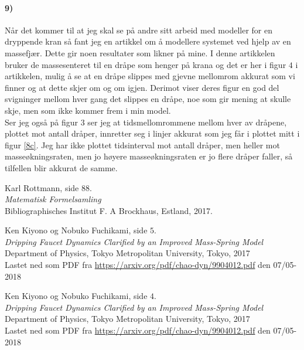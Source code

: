 \documentclass[11pt, A4paper,norsk]{article}
\begin{document}
		\paragraph{9)}
			\begin{flushleft}
Når det kommer til at jeg skal se på andre sitt arbeid med modeller for en dryppende kran så fant jeg en artikkel om å modellere systemet ved hjelp av en massefjær. Dette gir noen resultater som likner på mine. I denne artikkelen bruker de massesenteret til en dråpe som henger på krana og det er her i figur $4$ i artikkelen, \cite{Fig4_Tokyo} mulig å se at en dråpe slippes med gjevne mellomrom akkurat som vi finner og at dette skjer om og om igjen. Derimot viser deres figur en god del svigninger mellom hver gang det slippes en dråpe, noe som gir mening at skulle skje, men som ikke kommer frem i min model. \\

Ser jeg også på figur $3$ \cite{Fig3_Tokyo} ser jeg at tidsmellomrommene mellom hver av dråpene, plottet mot antall dråper, innretter seg i linjer akkurat som jeg får i plottet mitt i figur \ref{8c}. Jeg har ikke plottet tidsinterval mot antall dråper, men heller mot masseøkningsraten, men jo høyere masseøkningsraten er jo flere dråper faller, så tilfellen blir akkurat de samme.
			\end{flushleft}








		\begin{thebibliography}{9}
Karl Rottmann, side $88$. \\
\textit{Matematisk Formelsamling} \\
Bibliographisches Institut F. A Brockhaus, Estland, 2017.

Ken Kiyono og Nobuko Fuchikami, side $5$. \\
\textit{Dripping Faucet Dynamics Clarified by an Improved Mass-Spring Model} \\
Department of Physics, Tokyo Metropolitan University, Tokyo, 2017 \\
Lastet ned som PDF fra \url{https://arxiv.org/pdf/chao-dyn/9904012.pdf} den 07/05-2018

Ken Kiyono og Nobuko Fuchikami, side $4$. \\
\textit{Dripping Faucet Dynamics Clarified by an Improved Mass-Spring Model} \\
Department of Physics, Tokyo Metropolitan University, Tokyo, 2017 \\
Lastet ned som PDF fra \url{https://arxiv.org/pdf/chao-dyn/9904012.pdf} den 07/05-2018
		\end{thebibliography}
\end{document}
